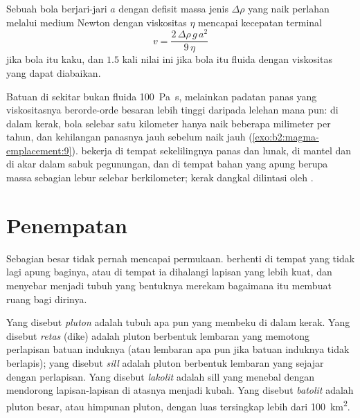 \begin{proposition}\label{prop:b2:magma-emplacement:stokes}
Sebuah bola berjari-jari $a$ dengan defisit massa jenis $\Delta\rho$ yang naik perlahan melalui
medium Newton dengan viskositas $\eta$ mencapai kecepatan terminal
\[
v = \frac{2\,\Delta\rho\,g\,a^2}{9\,\eta}
\]
jika bola itu kaku, dan $1.5$ kali nilai ini jika bola itu fluida dengan viskositas yang dapat diabaikan.
\end{proposition}
\admitted

Batuan di sekitar  bukan fluida \qty{100}{Pa.s}, melainkan padatan panas
yang viskositasnya berorde-orde besaran lebih tinggi daripada lelehan mana pun: di dalam
kerak, bola  selebar satu kilometer hanya naik beberapa milimeter per tahun, dan
kehilangan panasnya jauh sebelum naik jauh (\cref{exo:b2:magma-emplacement:9}). 
bekerja di tempat sekelilingnya panas dan lunak, di mantel dan di akar dalam
sabuk pegunungan, dan di tempat bahan yang apung berupa massa sebagian lebur
selebar berkilometer; kerak dangkal dilintasi oleh .

\section{Penempatan}

Sebagian besar  tidak pernah mencapai permukaan.  berhenti di tempat yang tidak lagi apung baginya,
atau di tempat ia dihalangi lapisan yang lebih kuat, dan menyebar menjadi tubuh yang bentuknya
merekam bagaimana  itu membuat ruang bagi dirinya.

\begin{definition}\label{def:b2:magma-emplacement:bodies}
Yang disebut \emph{pluton} adalah tubuh  apa pun yang membeku di dalam
kerak. Yang disebut \emph{retas} (dike) adalah pluton berbentuk lembaran yang memotong
perlapisan batuan induknya (atau lembaran apa pun jika batuan induknya tidak berlapis); yang disebut
\emph{sill} adalah pluton berbentuk lembaran yang sejajar dengan perlapisan. Yang disebut
\emph{lakolit} adalah sill yang menebal dengan mendorong lapisan-lapisan
di atasnya menjadi kubah. Yang disebut \emph{batolit} adalah pluton besar,
atau himpunan pluton, dengan luas tersingkap lebih dari \qty{100}{km^2}.
\end{definition}

